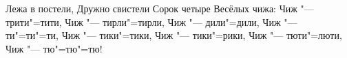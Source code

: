 \noindent\hspace*{5cm}%
\begin{minipage}[t]{\dimexpr\linewidth-5cm}
               Лежа в постели, \newline
               Дружно свистели \newline
               Сорок четыре \newline
               Весёлых чижа: \newline
               Чиж "---  трити"=тити\newline, 
               Чиж "--- тирли"=тирли, \newline
               Чиж "--- дили"=дили, \newline
               Чиж "--- ти"=ти"=ти, \newline
               Чиж "--- тики"=тики, \newline
               Чиж "--- тики"=рики, \newline
               Чиж "--- тюти"=люти, \newline
               Чиж "--- тю"=тю"=тю!\newline
\end{minipage}

              